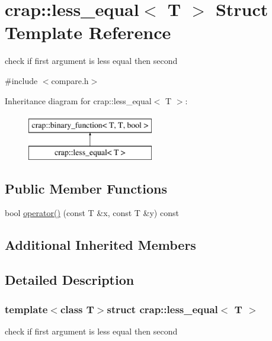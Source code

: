 \hypertarget{structcrap_1_1less__equal}{\section{crap\-:\-:less\-\_\-equal$<$ T $>$ Struct Template Reference}
\label{structcrap_1_1less__equal}
}


check if first argument is less equal then second  




{\ttfamily \#include $<$compare.\-h$>$}

Inheritance diagram for crap\-:\-:less\-\_\-equal$<$ T $>$\-:\begin{figure}[H]
\begin{center}
\leavevmode
\includegraphics[height=2.000000cm]{structcrap_1_1less__equal}
\end{center}
\end{figure}
\subsection*{Public Member Functions}
\begin{DoxyCompactItemize}
\item 
bool \hyperlink{structcrap_1_1less__equal_af0f8957c39bc5b50da197e9db962a596}{operator()} (const T \&x, const T \&y) const 
\end{DoxyCompactItemize}
\subsection*{Additional Inherited Members}


\subsection{Detailed Description}
\subsubsection*{template$<$class T$>$struct crap\-::less\-\_\-equal$<$ T $>$}

check if first argument is less equal then second 

